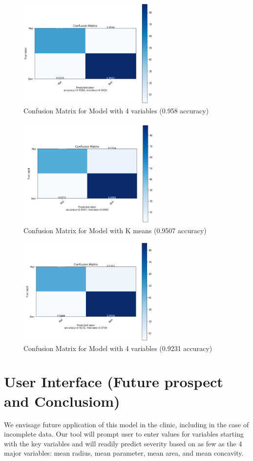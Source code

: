 \documentclass[conference]{IEEEtran}
\begin{document}
\begin{figure}[htbp]
\centerline{\includegraphics [width = 7cm] {cm1.png}}
\caption{Confusion Matrix for Model with 4 variables (0.958 accuracy)}
\label{fig}
\end{figure}
\begin{figure}[htbp]
\centerline{\includegraphics [width = 7cm] {cm2.png}}
\caption{Confusion Matrix for Model with K means (0.9507 accuracy)}
\label{fig}
\end{figure}
\begin{figure}[htbp]
\centerline{\includegraphics [width = 7cm] {cm4.png}}
\caption{Confusion Matrix for Model with 4 variables (0.9231 accuracy)}
\label{fig}
\end{figure}


\section{User Interface (Future prospect and Conclusiom)}
We envisage future application of this model in the clinic, including in the case of incomplete data. Our tool will prompt user to enter values for variables starting with the key variables and will readily predict severity based on as few as the 4 major variables: mean radius, mean parameter, mean area, and mean concavity.
\end{document}
